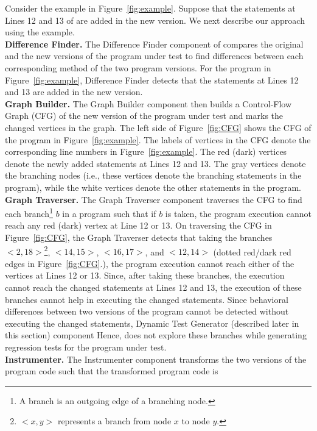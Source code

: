 Consider the example in Figure~\ref{fig:example}. Suppose that the statements at Lines 12 and 13 of  are added in the new version. 	We next describe our approach using the example.
\\ \textbf{Difference Finder.} The Difference Finder component of compares the original and the new versions of the program under test to find differences between each corresponding method of the two program versions. For the program in Figure~\ref{fig:example}, Difference Finder detects that the statements at Lines 12 and 13 are added in the new version. 
\\ \textbf{Graph Builder. }The Graph Builder component then builds a Control-Flow Graph (CFG) of the new version of  the program under test and marks the changed vertices in the graph. The left side of Figure~\ref{fig:CFG} shows the CFG of the program in Figure~\ref{fig:example}. The labels of vertices in the CFG denote the corresponding line numbers in Figure~\ref{fig:example}. The red (dark) vertices denote the newly added statements at Lines 12 and 13. The gray vertices denote the branching nodes (i.e., these vertices denote the branching statements in the program), while the white vertices denote the other statements in the program.
\\ \textbf{Graph Traverser.} The Graph Traverser component traverses the CFG to find each branch\footnote{A branch is an outgoing edge of a branching node.} $b$ in a program such that if $b$ is taken, the program execution cannot reach any red (dark) vertex at Line 12 or 13.  On traversing the CFG in Figure~\ref{fig:CFG}, the Graph Traverser detects that taking the branches $<2, 18>$\footnote{$<x,y>$ represents a branch from node $x$ to node $y$.}, $<14, 15>$, $<16, 17>$, and $<12, 14>$ (dotted red/dark red edges in Figure~\ref{fig:CFG}.), the program execution cannot reach either of the vertices at Lines 12 or 13. Since, after taking these branches, the execution cannot reach the changed statements at Lines 12 and 13, the execution of these branches cannot help in executing the changed statements. Since behavioral differences between two versions of the program cannot be detected without executing the changed statements, Dynamic Test Generator (described later in this section) component Hence, does not explore these branches while generating regression tests for the program under test. 
\\ \textbf{Instrumenter. }The Instrumenter component transforms the two versions of the
program code such that the transformed program code is
